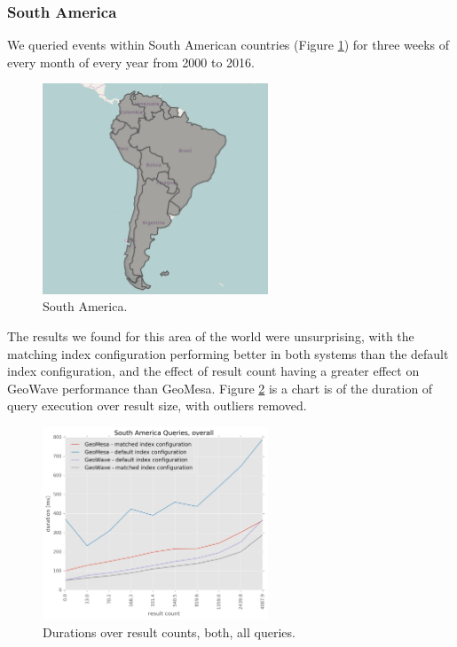 \subsubsection{South America}

We queried events within South American countries (Figure \ref{southamerica})
for three weeks of every month of every year from 2000 to 2016.

\begin{figure}[h!tb]
  \centering
  \includegraphics[width=0.60\textwidth]{../docs/img/gdelt/south-america-countries.png}
  \caption{South America.}
  \label{southamerica}
\end{figure}

The results we found for this area of the world were unsurprising,
with the matching index configuration performing better in both systems than the default index configuration,
and the effect of result count having a greater effect on GeoWave performance than GeoMesa.
Figure \ref{sadurations} is a chart is of the duration of query execution over result size, with outliers removed.

\begin{figure}[h!tb]
  \centering
  \includegraphics[width=0.60\textwidth]{../docs/img/gdelt/sa-overall-duration-vs-result-both.png}
  \caption{Durations over result counts, both, all queries.}
  \label{sadurations}
\end{figure}


